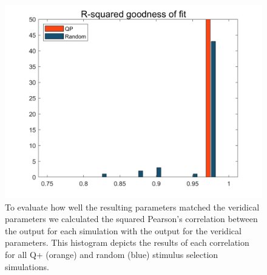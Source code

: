 \documentclass[
  english,
  man,floatsintext]{apa6}
\begin{document}
\newpage

\begin{figure}
  
  {\centering \includegraphics[width=500px]{../results/figs/fig2_7Outcomes_15Noise_12trialLength_800TR} 
  
  }
  
  \caption{To evaluate how well the resulting parameters matched the veridical parameters we calculated the squared Pearson's correlation between the output for each simulation with the output for the veridical parameters. This histogram depicts the results of each correlation for all Q+ (orange) and random (blue) stimulus selection simulations.
\newpage}\label{fig:results-figure-firstsims-2}
  \end{figure}




\newpage
\end{document}
